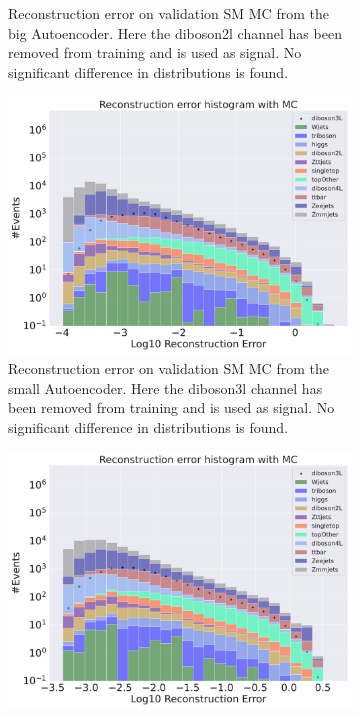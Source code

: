 \begin{figure}[H]
\begin{subfigure}{.45\textwidth}
        \caption{Reconstruction error on validation SM MC from the big Autoencoder. Here the diboson2l channel has been removed from training and 
        is used as signal. No significant difference in distributions is found. }
        \label{fig:ae_big_diboson2l}
    \end{subfigure}
    \hfill 
    \begin{subfigure}{.45\textwidth}
        \includegraphics[width=\textwidth]{Figures/AE_testing/small/b_data_recon_big_rm3_feats_sig_diboson3l.pdf}
        \caption{Reconstruction error on validation SM MC from the small Autoencoder. Here the diboson3l channel has been removed from training and 
        is used as signal. No significant difference in distributions is found. }
        \label{fig:ae_small_diboson3l}
    \end{subfigure}
    \hfill
    \begin{subfigure}{.45\textwidth}
        \includegraphics[width=\textwidth]{Figures/AE_testing/big/b_data_recon_big_rm3_feats_sig_diboson3l.pdf}

\end{subfigure}
\end{figure}

